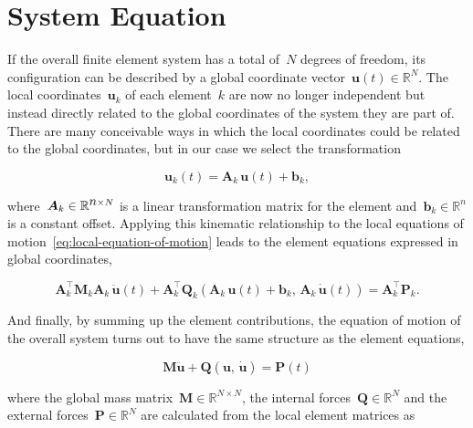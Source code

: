 \newpage
\section{System Equation}

If the overall finite element system has a total of~$N$ degrees of freedom, its configuration can be described by a global coordinate vector~$\boldsymbol{u}(t) \in \mathbb{R}^{N}$.
The local coordinates~$\boldsymbol{u}_{k}$ of each element~$k$ are now no longer independent but instead directly related to the global coordinates of the system they are part of.
There are many conceivable ways in which the local coordinates could be related to the global coordinates, but in our case we select the transformation

\begin{equation}
\boldsymbol{u}_{k}(t) = \boldsymbol{A}_{k}\,\boldsymbol{u}(t) + \boldsymbol{b}_{k},\label{eq:kinematics-local-global}
\end{equation}

where~$\boldsymbol{A}_{k} \in \mathbb{R}^{\mathlarger{n} \times N}$ is a linear transformation matrix for the element and~$\boldsymbol{b}_{k} \in \mathbb{R}^{n}$ is a constant offset.
Applying this kinematic relationship to the local equations of motion~\eqref{eq:local-equation-of-motion} leads to the element equations expressed in global coordinates,

\begin{equation}
\boldsymbol{A}_{k}^\intercal\boldsymbol{M}_{k}\boldsymbol{A}_{k}\,\ddot{\boldsymbol{u}}(t) + \boldsymbol{A}_{k}^\intercal\boldsymbol{Q}_{k}(\boldsymbol{A}_{k}\,\boldsymbol{u}(t) + \boldsymbol{b}_{k},\,\boldsymbol{A}_{k}\,\dot{\boldsymbol{u}}(t)) = \boldsymbol{A}_{k}^\intercal\boldsymbol{P}_{k}.
\end{equation}

And finally, by summing up the element contributions, the equation of motion of the overall system turns out to have the same structure as the element equations,

\begin{equation}
\boldsymbol{M}\ddot{\boldsymbol{u}} + \boldsymbol{Q}(\boldsymbol{u},\,\dot{\boldsymbol{u}}) = \boldsymbol{P}(t)\label{eq:global-equation-of-motion}
\end{equation}

where the global mass matrix~$\boldsymbol{M} \in \mathbb{R}^{N \times N}$, the internal forces~$\boldsymbol{Q} \in \mathbb{R}^{N}$ and the external forces~$\boldsymbol{P} \in \mathbb{R}^{N}$ are calculated from the local element matrices as

